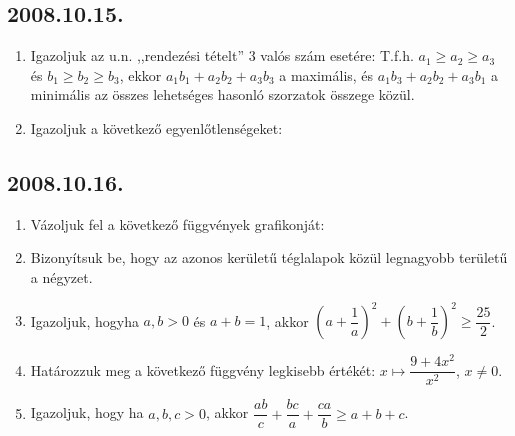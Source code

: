 \subsection*{2008.10.15.}
\begin{enumerate}
\item Igazoljuk az u.n. ,,rendezési tételt'' $3$ valós szám esetére: T.f.h. $a_1\geq a_2\geq a_3$ és $b_1\geq b_2\geq b_3$, ekkor $a_1b_1+a_2b_2+a_3b_3$ a maximális, és $a_1b_3+a_2b_2+a_3b_1$ a minimális az összes lehetséges hasonló szorzatok összege közül. 
\item  Igazoljuk a következő egyenlőtlenségeket: 
\end{enumerate}
\subsection*{2008.10.16.}
\begin{enumerate}
\item Vázoljuk fel a következő függvények grafikonját:
\item Bizonyítsuk be, hogy az azonos kerületű téglalapok közül legnagyobb területű a négyzet.
\item Igazoljuk, hogyha $a,b>0$ és $a+b=1$, akkor $\left(a+\dfrac{1}{a}\right)^2+\left(b+\dfrac{1}{b}\right)^2\geq\dfrac{25}{2}$.
\item Határozzuk meg a következő függvény legkisebb értékét: $x\mapsto \dfrac{9+4x^2}{x^2}$, $x\neq0$.
\item Igazoljuk, hogy ha $a,b,c>0$, akkor $\dfrac{ab}{c}+\dfrac{bc}{a}+\dfrac{ca}{b}\geq a+b+c$.
\end{enumerate}
